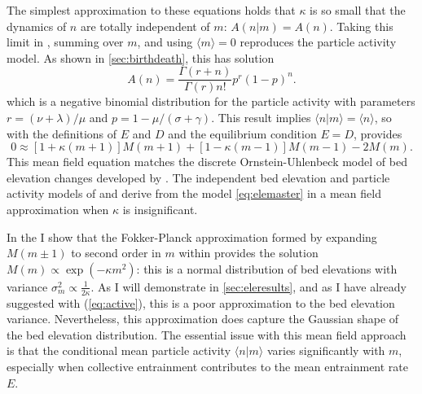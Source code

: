 The simplest approximation to these equations holds that $\kappa$ is so small that the dynamics of $n$ are totally independent of $m$: $A(n|m) = A(n)$. Taking this limit in \DIFdelbegin {}\DIFdelend \DIFaddbegin {}\DIFaddend , summing over $m$, and using $\langle m \rangle = 0$ reproduces the \citet{Ancey2008} particle activity model.
As shown in \DIFdelbegin {}\DIFdelend \DIFaddbegin {}\DIFaddend \ref{sec:birthdeath}, this has \DIFaddbegin {}\DIFaddend solution
\begin{equation} A(n) = \frac{\Gamma(r+n)}{\Gamma(r)n!}p^r(1-p)^n.\label{eq:ancey}\end{equation}
which is a negative binomial distribution for the particle activity with parameters $r=(\nu+\lambda)/\mu$ and $p=1-\mu/(\sigma+\gamma).$
This result implies $\langle n | m \rangle = \langle n \rangle$, so with the definitions of $E$ and $D$ and the equilibrium condition $E=D$, \DIFdelbegin {}\DIFdelend \DIFaddbegin {}\DIFaddend provides
\begin{equation}0 \approx [1+\kappa(m+1)]M(m+1) + [1-\kappa(m-1)]M(m-1)-2M(m). \label{eq:ou} \end{equation}
This mean field equation matches the discrete Ornstein-Uhlenbeck model of bed elevation changes developed by \citet{Martin2014}.
The independent bed elevation and particle activity models of \citet{Martin2014} and \citet{Ancey2008} derive from the model \DIFdelbegin {}\DIFdelend \DIFaddbegin {}\DIFaddend \ref{eq:elemaster} in a mean field approximation when $\kappa$ is insignificant.

In the \DIFdelbegin {}\DIFdelend \DIFaddbegin {}\DIFaddend I show that the Fokker-Planck approximation \citep{Gardiner1983} formed by expanding $M(m\pm 1)$ to second order in $m$ within \DIFdelbegin {}\DIFdelend \DIFaddbegin {}\DIFaddend provides the solution $M(m) \propto \exp(-\kappa m^2)$: this is a normal distribution of bed elevations with variance $\sigma_m^2 \propto \frac{1}{2\kappa}$.
As I will demonstrate in \DIFdelbegin {}\DIFdelend \DIFaddbegin {}\DIFaddend \ref{sec:eleresults}, and as I have already suggested with \DIFdelbegin {}\DIFdelend \DIFaddbegin {}\DIFaddend (\ref{eq:active}), this is a poor approximation to the bed elevation variance. Nevertheless, this approximation does capture the Gaussian shape of the bed elevation distribution.
The essential issue with this mean field approach is that \DIFaddbegin {}\DIFaddend the conditional mean particle activity $\langle n | m \rangle$ varies significantly with $m$\DIFdelbegin {}\DIFdelend , especially when collective entrainment contributes to the mean entrainment rate $E$.
\DIFdelbegin {}\DIFdelend 


